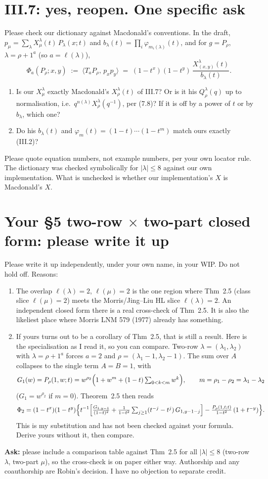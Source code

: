 \documentclass[10pt]{article}
\begin{document}
\section{III.7: yes, reopen. One specific ask}
Please check our dictionary against Macdonald's conventions. In the draft, $p_\mu=\sum_\lambda X^\lambda_\mu(t)\,P_\lambda(x;t)$ and $b_\lambda(t)=\prod_i\varphi_{m_i(\lambda)}(t)$, and for $g=P_\rho$, $\lambda=\rho+1^a$ (so $a=\ell(\lambda)$),
\[
\Phi_a(P_\rho;x,y)\;:=\;\langle T_aP_\rho,\,p_xp_y\rangle\;=\;(1-t^x)(1-t^y)\,\frac{X^\lambda_{(x,y)}(t)}{b_\lambda(t)} .
\]
\begin{enumerate}
\item Is our $X^\lambda_\mu$ exactly Macdonald's $X^\lambda_\rho(t)$ of III.7? Or is it his $Q^\lambda_\rho(q)$ up to normalisation, i.e.\ $q^{n(\lambda)}X^\lambda_\rho(q^{-1})$, per (7.8)? If it is off by a power of $t$ or by $b_\lambda$, which one?
\item Do his $b_\lambda(t)$ and $\varphi_m(t)=(1-t)\cdots(1-t^m)$ match ours exactly (III.2)?
\end{enumerate}
Please quote equation numbers, not example numbers, per your own locator rule. The dictionary was checked symbolically for $|\lambda|\le8$ against our own implementation. What is unchecked is whether our implementation's $X$ is Macdonald's $X$.

\section{Your \S5 two-row $\times$ two-part closed form: please write it up}
Please write it up independently, under your own name, in your WIP. Do not hold off. Reasons:
\begin{enumerate}[label=(\alph*)]
\item The overlap $\ell(\lambda)=2$, $\ell(\mu)=2$ is the one region where Thm~2.5 (class slice $\ell(\mu)=2$) meets the Morris/Jing--Liu HL slice $\ell(\lambda)=2$. An independent closed form there is a real cross-check of Thm~2.5. It is also the likeliest place where Morris LNM 579 (1977) already has something.
\item If yours turns out to be a corollary of Thm~2.5, that is still a result. Here is the specialisation as I read it, so you can compare. Two-row $\lambda=(\lambda_1,\lambda_2)$ with $\lambda=\rho+1^a$ forces $a=2$ and $\rho=(\lambda_1-1,\lambda_2-1)$. The sum over $A$ collapses to the single term $A=B=1$, with
\[
G_1(w)=P_\rho(1,w;t)=w^{\rho_2}\Bigl(1+w^{m}+(1-t)\textstyle\sum_{0<k<m}w^k\Bigr),\qquad m=\rho_1-\rho_2=\lambda_1-\lambda_2
\]
($G_1=w^{\rho_2}$ if $m=0$). Theorem~2.5 then reads
\[
\Phi_2=(1-t^x)(1-t^y)\Bigl\{t^{-1}\Bigl[\tfrac{G_{1,y-1}}{(1-t)^2}+\tfrac{1}{1-t^2}\textstyle\sum_{j\ge1}(t^{-j}-t^{j})\,G_{1,y-1-j}\Bigr]-\tfrac{P_\rho(1,t;t)}{1-t^2}\,(1+t^{-y})\Bigr\}.
\]
This is my substitution and has not been checked against your formula. Derive yours without it, then compare.
\end{enumerate}
\textbf{Ask:} please include a comparison table against Thm~2.5 for all $|\lambda|\le8$ (two-row $\lambda$, two-part $\mu$), so the cross-check is on paper either way. Authorship and any coauthorship are Robin's decision. I have no objection to separate credit.
\end{document}
